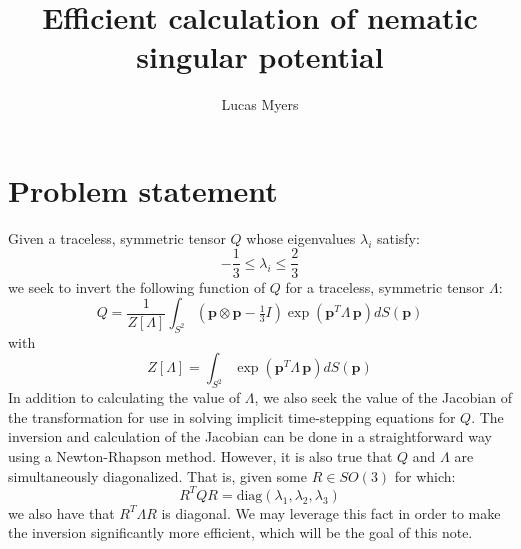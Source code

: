\documentclass[reqno]{article}
\begin{document}
	\title{Efficient calculation of nematic singular potential}
	\author{Lucas Myers}
	\maketitle

\section{Problem statement}
Given a traceless, symmetric tensor $Q$ whose eigenvalues $\lambda_i$ satisfy:
\begin{equation}
    -\frac13 \leq \lambda_i \leq \frac23
\end{equation}
we seek to invert the following function of $Q$ for a traceless, symmetric tensor $\Lambda$:
\begin{equation} \label{eq:inversion-equation}
    Q
    =
    \frac{1}{Z\left[\Lambda\right]}
    \int_{S^2} \left( \mathbf{p}\otimes \mathbf{p} - \tfrac13 I \right)
    \exp\left( \mathbf{p}^T \Lambda \, \mathbf{p} \right) dS\left(\mathbf{p}\right)
\end{equation}
with
\begin{equation}
    Z[\Lambda]  
    =
    \int_{S^2} \exp\left( \mathbf{p}^T \Lambda \, \mathbf{p} \right) dS\left(\mathbf{p}\right)
\end{equation}
In addition to calculating the value of $\Lambda$, we also seek the value of the Jacobian of the transformation for use in solving implicit time-stepping equations for $Q$.
The inversion and calculation of the Jacobian can be done in a straightforward way using a Newton-Rhapson method.
However, it is also true that $Q$ and $\Lambda$ are simultaneously diagonalized.
That is, given some $R \in SO(3)$ for which:
\begin{equation}
    R^T Q R
    =
    \text{diag}\left( \lambda_1, \lambda_2, \lambda_3 \right)
\end{equation}
we also have that $R^T \Lambda R$ is diagonal.
We may leverage this fact in order to make the inversion significantly more efficient, which will be the goal of this note.
\end{document}
